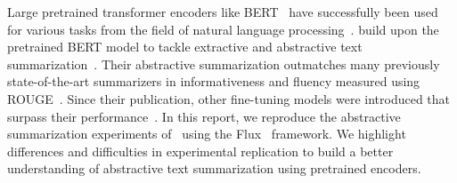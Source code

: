 Large pretrained transformer encoders like BERT~\cite{DevlinCLT2019} have successfully been used for various tasks from the field of natural language processing~\cite{LiuL2019}. \citeauthor{LiuL2019} build upon the pretrained BERT model to tackle extractive and abstractive text summarization~\cite{LiuL2019}. Their abstractive summarization outmatches many previously state-of-the-art summarizers in informativeness and fluency measured using ROUGE~\cite{LiuL2019,Lin2004}.
Since their publication, other fine-tuning models were introduced that surpass their performance~\cite{Aghajanyan2020,SavelievaAR2020}.
In this report, we reproduce the abstractive summarization experiments of~\citeauthor{LiuL2019} using the Flux~\cite{InnesSFGRJKPS2018} framework.
We highlight differences and difficulties in experimental replication to build a better understanding of abstractive text summarization using pretrained encoders. 
